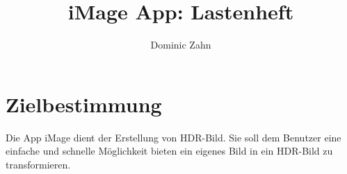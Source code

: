 \documentclass[parskip=full]{scrartcl}
\title{iMage App: Lastenheft}
\author{Dominic Zahn}
\begin{document}
\maketitle

\section{Zielbestimmung}

Die \gls{App} iMage dient der Erstellung von \gls{HDR-Bild}. Sie soll dem Benutzer eine einfache und
schnelle Möglichkeit bieten ein eigenes Bild in ein \gls{HDR-Bild} zu transformieren.



\printnoidxglossaries
\end{document}
